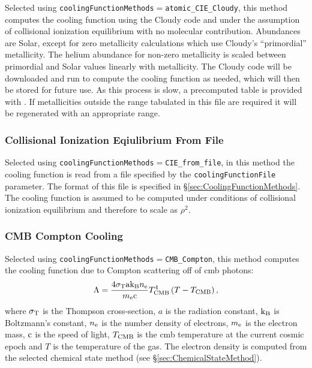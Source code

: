 Selected using {\tt coolingFunctionMethods}$=${\tt atomic\_CIE\_Cloudy}, this method computes the cooling function using the {\sc Cloudy} code and under the assumption of collisional ionization equilibrium with no molecular contribution. Abundances are Solar, except for zero metallicity calculations which use {\sc Cloudy}'s ``primordial'' metallicity. The helium abundance for non-zero metallicity is scaled between primordial and Solar values linearly with metallicity. The {\sc Cloudy} code will be downloaded and run to compute the cooling function as needed, which will then be stored for future use. As this process is slow, a precomputed table is provided with \glc. If metallicities outside the range tabulated in this file are required it will be regenerated with an appropriate range.

\subsubsection{Collisional Ionization Eqiulibrium From File}

Selected using {\tt coolingFunctionMethods}$=${\tt CIE\_from\_file}, in this method the cooling function is read from a file specified by the {\tt coolingFunctionFile} parameter. The format of this file is specified in \S\ref{sec:CoolingFunctionMethods}. The cooling function is assumed to be computed under conditions of collisional ionization equilibrium and therefore to scale as $\rho^2$.

\subsubsection{CMB Compton Cooling}

Selected using {\tt coolingFunctionMethods}$=${\tt CMB\_Compton}, this method computes the cooling function due to Compton scattering off of \gls{cmb} photons:
\begin{equation}
\Lambda = {4 \sigma_{\rm T} {\rm a} {\rm k}_{\rm B} n_{\rm e } \over m_{\rm e} \clight} T_{\rm CMB}^4 \left( T - T_{\rm CMB} \right),
\end{equation}
where $\sigma_{\rm T}$ is the Thompson cross-section, $a$ is the radiation constant, ${\rm k}_{\rm B}$ is Boltzmann's constant, $n_{\rm e}$ is the number density of electrons, $m_{\rm e}$ is the electron mass, $\clight$ is the speed of light, $T_{\rm CMB}$ is the \gls{cmb} temperature at the current cosmic epoch and $T$ is the temperature of the gas. The electron density is computed from the selected chemical state method (see \S\ref{sec:ChemicalStateMethod}).

